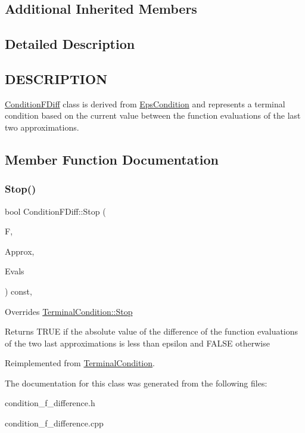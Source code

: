\subsection*{Additional Inherited Members}


\subsection{Detailed Description}
\hypertarget{function_8h_DESCRIPTION}{}\subsection{D\+E\+S\+C\+R\+I\+P\+T\+I\+ON}\label{function_8h_DESCRIPTION}
\hyperlink{class_condition_f_diff}{Condition\+F\+Diff} class is derived from \hyperlink{class_eps_condition}{Eps\+Condition} and represents a terminal condition based on the current value between the function evaluations of the last two approximations. 

\subsection{Member Function Documentation}
\mbox{\label{class_condition_f_diff_a31b06f62d08ab7c2ec1b011148889aab}} 
\subsubsection{\texorpdfstring{Stop()}{Stop()}}
{\footnotesize\ttfamily bool Condition\+F\+Diff\+::\+Stop (\begin{DoxyParamCaption}\item[{std\+::shared\+\_\+ptr$<$ \hyperlink{class_function}{Function} $>$}]{F,  }\item[{const std\+::vector$<$ \hyperlink{classv_point}{v\+Point} $>$ \&}]{Approx,  }\item[{const std\+::vector$<$ double $>$ \&}]{Evals }\end{DoxyParamCaption}) const\hspace{0.3cm}{\ttfamily [override]}, {\ttfamily [virtual]}}

Overrides \hyperlink{class_terminal_condition_ad6294bf2bd6f5e2c6164e461c24d3198}{Terminal\+Condition\+::\+Stop} \begin{DoxyReturn}{Returns}
T\+R\+UE if the absolute value of the difference of the function evaluations of the two last approximations is less than epsilon and F\+A\+L\+SE otherwise 
\end{DoxyReturn}


Reimplemented from \hyperlink{class_terminal_condition_ad6294bf2bd6f5e2c6164e461c24d3198}{Terminal\+Condition}.



The documentation for this class was generated from the following files\+:\begin{DoxyCompactItemize}
\item 
condition\+\_\+f\+\_\+difference.\+h\item 
condition\+\_\+f\+\_\+difference.\+cpp\end{DoxyCompactItemize}
